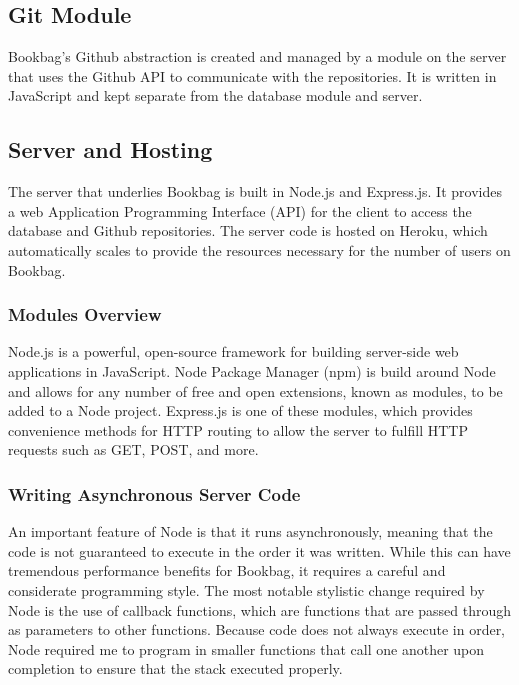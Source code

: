 \documentclass[pageno]{jpaper}
\begin{document}
\subsection{Git Module}

Bookbag's Github abstraction is created and managed by a module on the server that uses the Github API to communicate with the repositories. It is written in JavaScript and kept separate from the database module and server.

\subsection{Server and Hosting}

The server that underlies Bookbag is built in Node.js and Express.js. It provides a web Application Programming Interface (API) for the client to access the database and Github repositories. The server code is hosted on Heroku, which automatically scales to provide the resources necessary for the number of users on Bookbag.

\subsubsection{Modules Overview}

Node.js is a powerful, open-source framework for building server-side web applications in JavaScript. Node Package Manager (npm) is build around Node and allows for any number of free and open extensions, known as modules, to be added to a Node project. Express.js is one of these modules, which provides convenience methods for HTTP routing to allow the server to fulfill HTTP requests such as GET, POST, and more.

\subsubsection{Writing Asynchronous Server Code}

An important feature of Node is that it runs asynchronously, meaning that the code is not guaranteed to execute in the order it was written. While this can have tremendous performance benefits for Bookbag, it requires a careful and considerate programming style. The most notable stylistic change required by Node is the use of callback functions, which are functions that are passed through as parameters to other functions. Because code does not always execute in order, Node required me to program in smaller functions that call one another upon completion to ensure that the stack executed properly.
\end{document}
